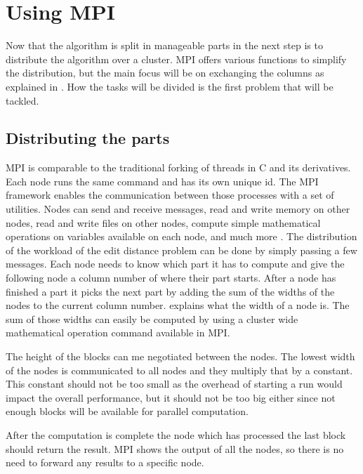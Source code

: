 \section{Using MPI}
Now that the algorithm is split in manageable parts in  the next step is to distribute the algorithm over a cluster.
MPI offers various functions to simplify the distribution, but the main focus will be on exchanging the columns as explained in .
How the tasks will be divided is the first problem that will be tackled.

\subsection{Distributing the parts}
MPI is comparable to the traditional forking of threads in C and its derivatives.
Each node runs the same command and has its own unique id.
The MPI framework enables the communication between those processes with a set of utilities.
Nodes can send and receive messages, read and write memory on other nodes, read and write files on other nodes, compute simple mathematical operations on variables available on each node, and much more \cite{MPI}.
The distribution of the workload of the edit distance problem can be done by simply passing a few messages.
Each node needs to know which part it has to compute and give the following node a column number of where their part starts.
After a node has finished a part it picks the next part by adding the sum of the widths of the nodes to the current column number.
 explains what the width of a node is.
The sum of those widths can easily be computed by using a cluster wide mathematical operation command available in MPI.

The height of the blocks can me negotiated between the nodes.
The lowest width of the nodes is communicated to all nodes and they multiply that by a constant.
This constant should not be too small as the overhead of starting a run would impact the overall performance, but it should not be too big either since not enough blocks will be available for parallel computation.

After the computation is complete the node which has processed the last block should return the result.
MPI shows the output of all the nodes, so there is no need to forward any results to a specific node.

